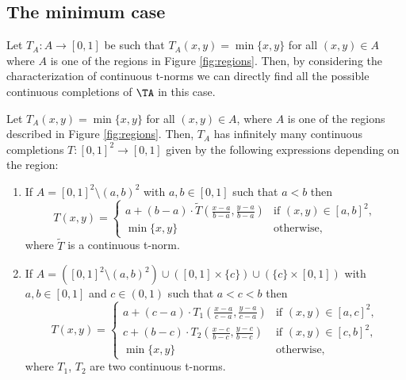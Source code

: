 \subsection{The minimum case}
Let $T_A:A \to [0,1]$ be such that $T_A(x,y)=\min\{x,y\}$ for all $(x,y) \in A$ where $A$ is one of the regions in Figure \ref{fig:regions}. Then, by considering the characterization of continuous t-norms we can directly find all the possible continuous completions of $\TA$ in this case.
\begin{proposition}\label{prop:completion-minimumcase} Let $T_A(x,y)=\min\{x,y\}$ for all $(x,y) \in A$, where $A$ is one of the regions described in Figure \ref{fig:regions}. Then, $T_A$ has infinitely many continuous completions $T:[0,1]^2 \to [0,1]$ given by the following expressions depending on the region:
	\begin{enumerate}[label=(\roman*)]
		\item If $A=[0,1]^2 \setminus (a,b)^2$ with $a,b \in [0,1]$ such that $a<b$ then
		$$
		T(x,y) =
		\left\{ \begin{array}{ll}
			a+(b-a)\cdot \tilde{T}\left(\frac{x-a}{b-a},\frac{y-a}{b-a}\right) &   \text{if }   (x,y) \in [a,b]^2, \\[.25cm]
			\min\{x,y\} & \text{otherwise,}
		\end{array} \right.
		$$
		where $\tilde{T}$ is a continuous t-norm.
		\item If $A=([0,1]^2 \setminus (a,b)^2) \cup ([0,1]\times \{c\}) \cup (\{c\}\times [0,1])$ with $a,b \in [0,1]$ and $c \in (0,1)$ such that $a<c<b$ then
		$$
		T(x,y) =
		\left\{ \begin{array}{ll}
			a+(c-a)\cdot T_1\left(\frac{x-a}{c-a},\frac{y-a}{c-a}\right) &   \text{if }   (x,y) \in [a,c]^2, \\[.25cm]
			c+(b-c)\cdot T_2\left(\frac{x-c}{b-c},\frac{y-c}{b-c}\right) &   \text{if }   (x,y) \in [c,b]^2, \\[.25cm]
			\min\{x,y\} & \text{otherwise,}
		\end{array} \right.
		$$
		where $T_1$, $T_2$ are two continuous t-norms.
	\end{enumerate}
\end{proposition}
